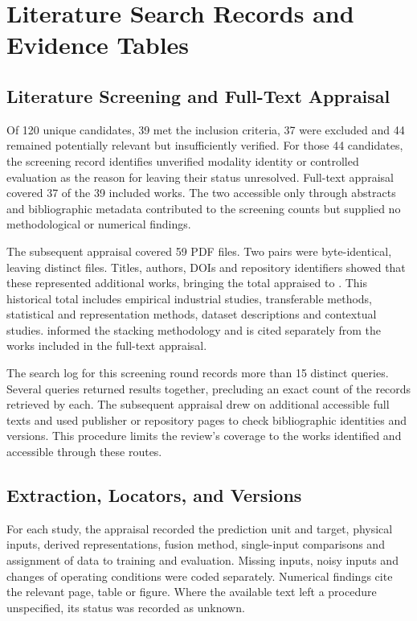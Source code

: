 \chapter{Literature Search Records and Evidence Tables}
\label{app:literature}
\section{Literature Screening and Full-Text Appraisal}
Of 120 unique candidates, 39 met the inclusion criteria, 37 were excluded and 44
remained potentially relevant but insufficiently verified. For those 44 candidates,
the screening record identifies unverified modality identity or controlled evaluation
as the reason for leaving their status unresolved. Full-text appraisal covered 37 of
the 39 included works. The two accessible only through abstracts and bibliographic
metadata contributed to the screening counts but supplied no methodological or
numerical findings.

The subsequent appraisal covered 59 PDF files. Two pairs were byte-identical, leaving
\ExpandedPDFCount{} distinct files. Titles, authors, DOIs and repository identifiers
showed that these represented \ExpandedPDFCount{} additional works, bringing the total
appraised to \ReviewWorkCount{}. This historical total includes empirical industrial
studies, transferable methods, statistical and representation methods, dataset
descriptions and contextual studies. \textcite{Ting1999Issues} informed the stacking methodology and is cited separately from
the \ReviewWorkCount{} works included in the full-text appraisal.

The search log for this screening round records more than 15 distinct queries. Several
queries returned results together, precluding an exact count of the records retrieved by
each. The subsequent appraisal drew on additional accessible full texts and used
publisher or repository pages to check bibliographic identities and versions. This
procedure limits the review's coverage to the works identified and accessible through
these routes.

\section{Extraction, Locators, and Versions}
For each study, the appraisal recorded the prediction unit and target, physical inputs,
derived representations, fusion method, single-input comparisons and assignment of data
to training and evaluation. Missing inputs, noisy inputs and changes of operating
conditions were coded separately. Numerical findings cite the relevant page, table or
figure. Where the available text left a procedure unspecified, its status was recorded
as unknown.

